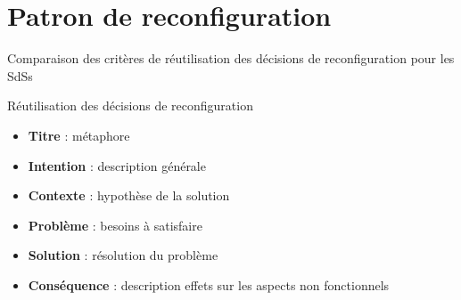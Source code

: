 \section{Patron de reconfiguration}

%
\begin{frame}{Comparaison des critères de réutilisation des décisions de reconfiguration
pour les SdSs}
\begin{table}[]
\end{table}
\end{frame}

\begin{frame}{Réutilisation des décisions de reconfiguration}
\begin{itemize}
\setlength\itemsep{0.7cm}
\item \textbf{Titre} : métaphore                                                                   
\item \textbf{Intention} : description générale                                                                   
\item \textbf{Contexte} : hypothèse de la solution                                                                    
\item \textbf{Problème} : besoins à satisfaire                                                                     
\item \textbf{Solution} : résolution du problème                                                                     
\item \textbf{Conséquence} : description effets sur les aspects non
fonctionnels                                                              
\end{itemize} 
\end{frame}

